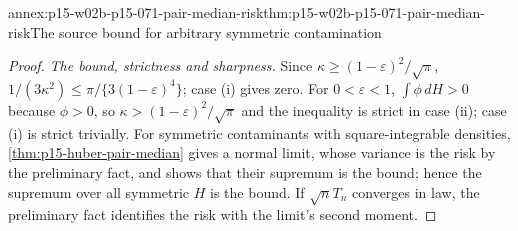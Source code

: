 \begin{annexitem}{annex:p15-w02b-p15-071-pair-median-risk}{thm:p15-w02b-p15-071-pair-median-risk}{The source bound for arbitrary symmetric contamination}
\begin{proof}
\emph{The bound, strictness and sharpness.} Since
\(\kappa\geq(1-\varepsilon)^2/\sqrt\pi\),
\(1/(3\kappa^2)\leq\pi/\{3(1-\varepsilon)^4\}\); case (i) gives zero.
For \(0<\varepsilon<1\), \(\int\phi\,dH>0\) because \(\phi>0\), so
\(\kappa>(1-\varepsilon)^2/\sqrt\pi\) and the inequality is strict in
case (ii); case (i) is strict trivially.
For symmetric contaminants with square-integrable densities,
\cref{thm:p15-huber-pair-median} gives a normal limit, whose variance is
the risk by the preliminary fact, and shows that their supremum is the
bound; hence the supremum over all symmetric \(H\) is the bound.
If \(\sqrt nT_n\) converges in law, the preliminary fact identifies the
risk with the limit's second moment.
\end{proof}
\end{annexitem}
